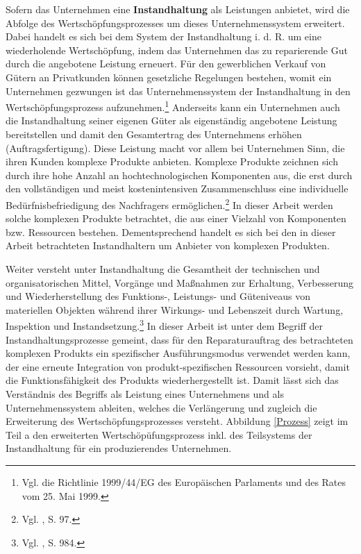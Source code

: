 Sofern das Unternehmen eine \textbf{Instandhaltung} als Leistungen anbietet, wird die Abfolge des Wertschöpfungsprozesses um dieses Unternehmenssystem erweitert. Dabei handelt es sich bei dem System der Instandhaltung i. d. R. um eine wiederholende Wertschöpfung, indem das Unternehmen das zu reparierende Gut durch die angebotene Leistung erneuert. Für den gewerblichen Verkauf von Gütern an Privatkunden können gesetzliche Regelungen bestehen, womit ein Unternehmen gezwungen ist das Unternehmenssystem der Instandhaltung in den Wertschöpfungsprozess aufzunehmen.\footnote{Vgl. die Richtlinie 1999/44/EG des Europäischen Parlaments und des Rates vom 25. Mai 1999.} Anderseits kann ein Unternehmen auch die Instandhaltung seiner eigenen Güter als eigenständig angebotene Leistung bereitstellen und damit den Gesamtertrag des Unternehmens erhöhen (Auftragsfertigung). Diese Leistung macht vor allem bei Unternehmen Sinn, die ihren Kunden komplexe Produkte anbieten. Komplexe Produkte zeichnen sich durch ihre hohe Anzahl an hochtechnologischen Komponenten aus, die erst durch den vollständigen und meist kostenintensiven Zusammenschluss eine individuelle Bedürfnisbefriedigung des Nachfragers ermöglichen.\footnote{Vgl. \cite{komplexe2009Schmidt}, S. 97.} In dieser Arbeit werden solche komplexen Produkte betrachtet, die aus einer Vielzahl von Komponenten bzw. Ressourcen bestehen. Dementsprechend handelt es sich bei den in dieser Arbeit betrachteten Instandhaltern um Anbieter von komplexen Produkten. 

Weiter versteht \citeauthor{helbing2010instandhaltung} unter Instandhaltung die \glqq Gesamtheit der technischen und organisatorischen Mittel, Vorgänge und Maßnahmen zur Erhaltung, Verbesserung und Wiederherstellung des Funktions-, Leistungs- und Güteniveaus von materiellen Objekten während ihrer Wirkungs- und Lebenszeit durch Wartung, Inspektion und Instandsetzung.\grqq\footnote{Vgl. \citeauthor{helbing2010instandhaltung}, S. 984.} In dieser Arbeit ist unter dem Begriff der Instandhaltungsprozesse gemeint, dass für den Reparaturauftrag des betrachteten komplexen Produkts ein spezifischer Ausführungsmodus verwendet werden kann, der eine erneute Integration von produkt-spezifischen Ressourcen vorsieht, damit die Funktionsfähigkeit des Produkts wiederhergestellt ist. Damit lässt sich das Verständnis des Begriffs als Leistung eines Unternehmens und als Unternehmenssystem ableiten, welches die Verlängerung und zugleich die Erweiterung des Wertschöpfungsprozesses versteht. Abbildung \ref{Prozess} zeigt im Teil a den erweiterten Wertschöpüfungsprozess inkl. des Teilsystems der Instandhaltung für ein produzierendes Unternehmen.

